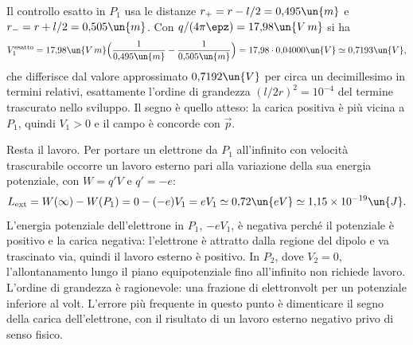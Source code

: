 \documentclass[main.tex]{subfiles}
\begin{document}
	Il controllo esatto in $P_1$ usa le distanze $r_+=r-l/2=0{,}495\un{m}$ e $r_-=r+l/2=0{,}505\un{m}$. Con $q/(4\pi\epz)=17{,}98\un{V\,m}$ si ha
	\[
	V_1^{\rm esatto}=17{,}98\un{V\,m}\Big(\frac1{0{,}495\un{m}}-\frac1{0{,}505\un{m}}\Big)=17{,}98\cdot0{,}04000\un{V}\simeq0{,}7193\un{V},
	\]
	che differisce dal valore approssimato $0{,}7192\un{V}$ per circa un decimillesimo in termini relativi, esattamente l'ordine di grandezza $(l/2r)^2=10^{-4}$ del termine trascurato nello sviluppo. Il segno è quello atteso: la carica positiva è più vicina a $P_1$, quindi $V_1>0$ e il campo è concorde con $\vec p$.
	
	Resta il lavoro. Per portare un elettrone da $P_1$ all'infinito con velocità trascurabile occorre un lavoro esterno pari alla variazione della sua energia potenziale, con $W=q'V$ e $q'=-e$:
	\[
	L_{\rm ext}=W(\infty)-W(P_1)=0-(-e)V_1=eV_1\simeq0{,}72\un{eV}\simeq1{,}15\times10^{-19}\un{J}.
	\]
	L'energia potenziale dell'elettrone in $P_1$, $-eV_1$, è negativa perché il potenziale è positivo e la carica negativa: l'elettrone è attratto dalla regione del dipolo e va trascinato via, quindi il lavoro esterno è positivo. In $P_2$, dove $V_2=0$, l'allontanamento lungo il piano equipotenziale fino all'infinito non richiede lavoro. L'ordine di grandezza è ragionevole: una frazione di elettronvolt per un potenziale inferiore al volt. L'errore più frequente in questo punto è dimenticare il segno della carica dell'elettrone, con il risultato di un lavoro esterno negativo privo di senso fisico.
	
\end{document}

